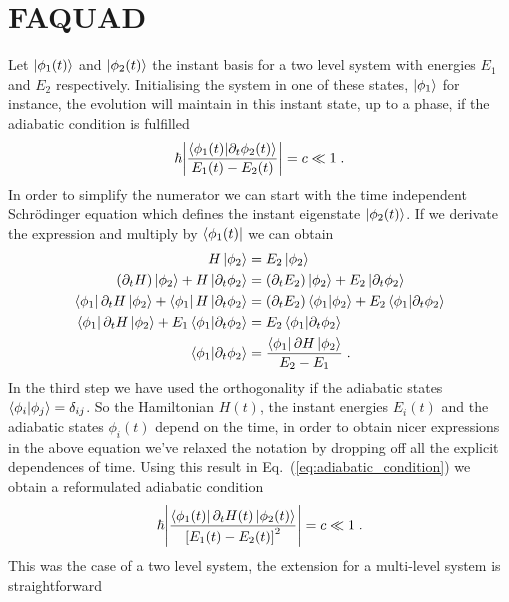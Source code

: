 \section{FAQUAD}
Let $\ket{\phi_1(t)}$ and $\ket{\phi_2(t)}$ the instant basis for a two level system with energies $E_1$ and $E_2$ respectively. Initialising the system in one of these states, $\ket{\phi_1}$ for instance, the evolution will maintain in this instant state, up to a phase, if the adiabatic condition is fulfilled \cite{Schiff1968}
\begin{equation}
	\hbar\abs{\frac{\braket{\phi_1(t)}{\partial_t\phi_2(t)}}{E_1(t)-E_2(t)}}=c\ll 1\;.
	\label{eq:adiabatic_condition}
\end{equation}
In order to simplify the numerator we can start with the time independent Schrödinger equation which defines the instant eigenstate $\ket{\phi_2(t)}$. If we derivate the expression and multiply by $\bra{\phi_1(t)}$ we can obtain
\begin{equation}
	\begin{split}
	H\ket{\phi_2}&=E_2\ket{\phi_2}\\
	(\partial_t H)\ket{\phi_2}+H\ket{\partial_t\phi_2}&=(\partial_t E_2)\ket{\phi_2}+E_2\ket{\partial_t\phi_2}\\
	\bra{\phi_1}\partial_t H\ket{\phi_2}+\bra{\phi_1}H\ket{\partial_t \phi_2}&=(\partial_t E_2)\braket{\phi_1}{\phi_2}+E_2\braket{\phi_1}{\partial_t \phi_2}\\
	\bra{\phi_1}\partial_t H\ket{\phi_2}+E_1\braket{\phi_1}{\partial_t\phi_2}&=E_2\braket{\phi_1}{\partial_t\phi_2}\\
	\braket{\phi_1}{\partial_t \phi_2}&=\frac{\bra{\phi_1}\partial H\ket{\phi_2}}{E_2-E_1}\; .
	\end{split}
\end{equation}
In the third step we have used the orthogonality if the adiabatic states $\braket{\phi_i}{\phi_j}=\delta_{ij}$. So the Hamiltonian $H(t)$, the instant energies $E_i(t)$ and the adiabatic states $\phi_i(t)$ depend on the time, in order to obtain nicer expressions in the above equation we've relaxed the notation by dropping off all the explicit dependences of time. Using this result in Eq.~(\ref{eq:adiabatic_condition}) we obtain a reformulated adiabatic condition
\begin{equation}
	\hbar\abs{\frac{\bra{\phi_1(t)}\partial_t H(t)\ket{\phi_2(t)}}{\left[E_1(t)-E_2(t)\right]^2}}=c\ll 1\; .
\end{equation}
This was the case of a two level system, the extension for a multi-level system is straightforward
